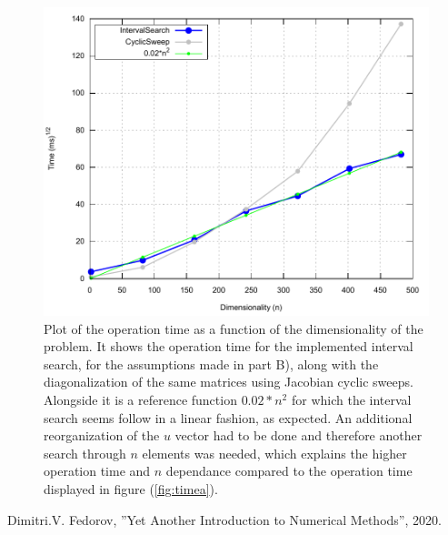 \documentclass{article}
\begin{document}
\begin{figure}[h]
	\centering
	\includegraphics[width=0.8\linewidth]{TimeB}
	\caption{Plot of the operation time as a function of the dimensionality of the problem. It shows the operation time for the implemented interval search, for the assumptions made in part B), along with the diagonalization of the same matrices using Jacobian cyclic sweeps. Alongside it is a reference function $0.02*n^{2}$ for which the interval search seems follow in a linear fashion, as expected. An additional reorganization of the $u$ vector had to be done and therefore another search through $n$ elements was needed, which explains the higher operation time and $n$ dependance compared to the operation time displayed in figure (\ref{fig:timea}). }
	\label{fig:timeb}
\end{figure}


\newpage
\medskip

\begin{thebibliography}{9}
	Dimitri.V. Fedorov, ”Yet Another Introduction to Numerical Methods”, 2020.
	
\end{thebibliography}
\end{document}
